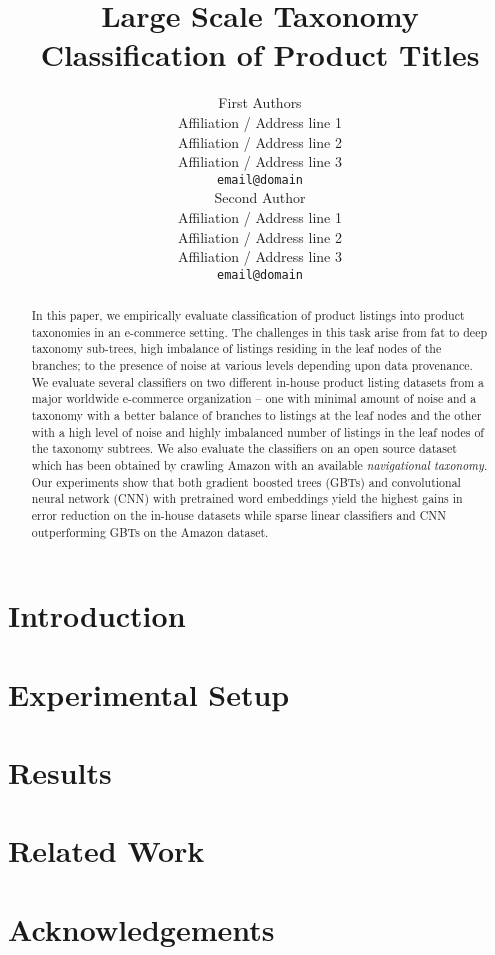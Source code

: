 \documentclass[11pt]{article}
\title{Large Scale Taxonomy Classification of Product Titles}
\author{First Authors \\
  Affiliation / Address line 1 \\
  Affiliation / Address line 2 \\
  Affiliation / Address line 3 \\
  {\tt email@domain} \\\And
  Second Author \\
  Affiliation / Address line 1 \\
  Affiliation / Address line 2 \\
  Affiliation / Address line 3 \\
  {\tt email@domain} \\}
\date{}
\begin{document}
\maketitle
\begin{abstract}
In this paper, we empirically evaluate classification of product listings into product taxonomies in an e-commerce setting.
The challenges in this task arise from fat to deep taxonomy sub-trees, high imbalance of listings residing in the leaf nodes of the branches; to the presence of noise at various levels depending upon data provenance.
We evaluate several classifiers on two different in-house product listing datasets from a major worldwide e-commerce organization -- 
one with minimal amount of noise and a taxonomy with a better balance of branches to listings at the leaf nodes and the other with a high level of noise and highly imbalanced number of listings in the leaf nodes of the taxonomy subtrees. 
We also evaluate the classifiers on an open source dataset which has been obtained by crawling Amazon with an available \textit{navigational taxonomy}. 
Our experiments show that both gradient boosted trees (GBTs) and convolutional neural network (CNN) with pretrained word embeddings yield the highest gains in error reduction on the in-house datasets while sparse linear classifiers and CNN outperforming GBTs on the Amazon dataset.

\end{abstract}

\section{Introduction}
\label{Sect:intro}

\section{Experimental Setup}
\label{Sect:experimental_setup}

\section{Results}
\label{Sect:results}

\section{Related Work}
\label{Sect:related}

\section{Acknowledgements}
\label{Sect:aknowledgement}



\end{document}
